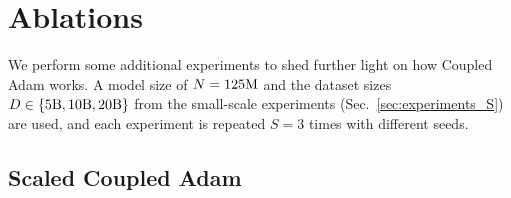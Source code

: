 
\section{Ablations}
\label{sec:ablations}

We perform some additional experiments to shed further light on how Coupled Adam works. A model size of $N = 125\rm M$ and the dataset sizes $D \in \{ 5\rm B, 10\rm B, 20\rm B \}$ from the small-scale experiments (Sec.~\ref{sec:experiments_S}) are used, and each experiment is repeated $S = 3$ times with different seeds. 

\subsection{Scaled Coupled Adam}
\label{sec:ablation_different_learning_rate}

